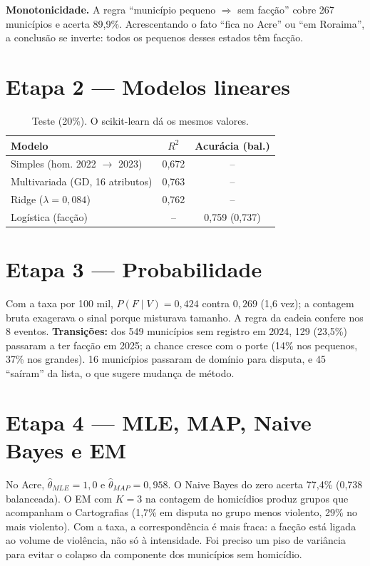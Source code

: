 \documentclass[10pt,a4paper,twocolumn]{article}
\begin{document}
\textbf{Monotonicidade.} A regra ``município pequeno $\Rightarrow$ sem facção'' cobre 267
municípios e acerta 89,9\%. Acrescentando o fato ``fica no Acre'' ou ``em Roraima'', a conclusão
se inverte: todos os pequenos desses estados têm facção.

\section{Etapa 2 — Modelos lineares}
\begin{table}[h]\centering\small
\begin{tabular}{lcc}\toprule
Modelo & $R^2$ & Acurácia (bal.)\\\midrule
Simples (hom. 2022 $\to$ 2023) & 0,672 & --\\
Multivariada (GD, 16 atributos) & 0,763 & --\\
Ridge ($\lambda=0{,}084$) & 0,762 & --\\
Logística (facção) & -- & 0,759 (0,737)\\\bottomrule
\end{tabular}\caption{Teste (20\%). O scikit-learn dá os mesmos valores.}\end{table}

\section{Etapa 3 — Probabilidade}
Com a taxa por 100 mil, $P(F\mid V)=0{,}424$ contra $0{,}269$ (1,6 vez); a contagem bruta exagerava
o sinal porque misturava tamanho. A regra da cadeia confere nos 8 eventos.
\textbf{Transições:} dos 549 municípios sem registro em 2024, 129 (23,5\%) passaram a ter facção
em 2025; a chance cresce com o porte (14\% nos pequenos, 37\% nos grandes). 16 municípios
passaram de domínio para disputa, e 45 ``saíram'' da lista, o que sugere mudança de método.

\section{Etapa 4 — MLE, MAP, Naive Bayes e EM}
No Acre, $\hat\theta_{MLE}=1{,}0$ e $\hat\theta_{MAP}=0{,}958$. O Naive Bayes do zero acerta
77,4\% (0,738 balanceada). O EM com $K=3$ na contagem de homicídios produz grupos que acompanham
o Cartografias (1,7\% em disputa no grupo menos violento, 29\% no mais violento). Com a taxa, a
correspondência é mais fraca: a facção está ligada ao volume de violência, não só à intensidade.
Foi preciso um piso de variância para evitar o colapso da componente dos municípios sem homicídio.
\end{document}
